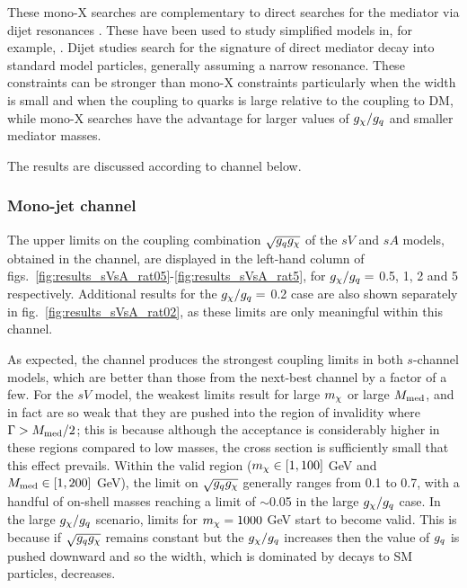 
These mono-X searches are complementary to direct searches for the mediator via dijet resonances \cite{Chatrchyan:2013qha, Aad:2014aqa, Aaltonen:2008dn, Khachatryan:2015sja}. These have been used to study simplified models in, for example, \cite{An:2012va, Zurek:tchannel}. Dijet studies search for the signature of direct mediator decay into standard model particles, generally assuming a narrow resonance. These constraints can be stronger than mono-X constraints particularly when the width is small and when the coupling to quarks is large relative to the coupling to DM, while mono-X searches have the advantage for larger values of $g_{\chi}/g_q$ and smaller mediator masses.

The results are discussed according to channel below.

\subsubsection{Mono-jet channel}

The upper limits on the coupling combination $\sqrt{g_q g_{\chi}}$ of the $sV$ and $sA$ models, obtained in the \monojet channel, are displayed in the left-hand column of figs.~\ref{fig:results_sVsA_rat05}-\ref{fig:results_sVsA_rat5}, for $g_{\chi}/g_q =$ 0.5, 1, 2 and 5 respectively. Additional results for the $g_{\chi}/g_q =$ 0.2 case are also shown separately in fig.~\ref{fig:results_sVsA_rat02}, as these limits are only meaningful within this channel.

As expected, the \monojet channel produces the strongest coupling limits in both $s$-channel models, which are better than those from the next-best \monoZ channel by a factor of a few. For the $sV$ model, the weakest limits result for large $m_{\chi}$ or large $M_{\mathrm{med}}$, and in fact are so weak that they are pushed into the region of invalidity where $\Gamma > M_{\mathrm{med}}/2$; this is because although the acceptance is considerably higher in these regions compared to low masses, the cross section is sufficiently small that this effect prevails. Within the valid region ($m_{\chi} \in [1, 100]$ GeV and $M_{\mathrm{med}} \in [1, 200]$ GeV), the limit on $\sqrt{g_q g_{\chi}}$ generally ranges from 0.1 to 0.7, with a handful of on-shell masses reaching a limit of $\sim$0.05 in the large $g_{\chi} / g_q$ case. In the large $g_{\chi}/g_q$ scenario, limits for $m_{\chi} = 1000$ GeV start to become valid. This is because if $\sqrt{g_q g_{\chi}}$ remains constant but the $g_{\chi} / g_q$ increases then the value of $g_q$ is pushed downward and so the width, which is dominated by decays to SM particles, decreases.

